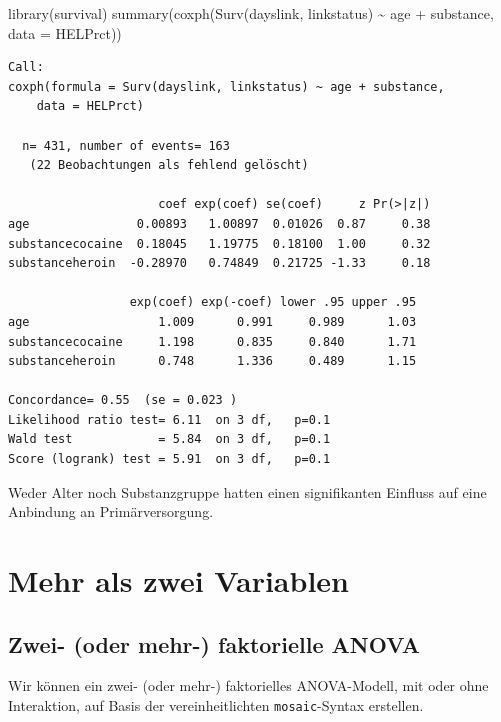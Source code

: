 \documentclass[
  ngerman,
]{scrbook}
\newenvironment{Shaded}{\begin{snugshade}}{\end{snugshade}}
\newcommand{\AttributeTok}[1]{\textcolor[rgb]{0.77,0.63,0.00}{#1}}
\newcommand{\FunctionTok}[1]{\textcolor[rgb]{0.00,0.00,0.00}{#1}}
\newcommand{\NormalTok}[1]{#1}
\newcommand{\SpecialCharTok}[1]{\textcolor[rgb]{0.00,0.00,0.00}{#1}}
\begin{document}
\begin{Shaded}
\begin{Highlighting}[]
\FunctionTok{library}\NormalTok{(survival)}
\FunctionTok{summary}\NormalTok{(}\FunctionTok{coxph}\NormalTok{(}\FunctionTok{Surv}\NormalTok{(dayslink, linkstatus) }\SpecialCharTok{\textasciitilde{}}\NormalTok{ age }\SpecialCharTok{+}\NormalTok{ substance, }
              \AttributeTok{data =}\NormalTok{ HELPrct))}
\end{Highlighting}
\end{Shaded}

\begin{verbatim}
Call:
coxph(formula = Surv(dayslink, linkstatus) ~ age + substance, 
    data = HELPrct)

  n= 431, number of events= 163 
   (22 Beobachtungen als fehlend gelöscht)

                     coef exp(coef) se(coef)     z Pr(>|z|)
age               0.00893   1.00897  0.01026  0.87     0.38
substancecocaine  0.18045   1.19775  0.18100  1.00     0.32
substanceheroin  -0.28970   0.74849  0.21725 -1.33     0.18

                 exp(coef) exp(-coef) lower .95 upper .95
age                  1.009      0.991     0.989      1.03
substancecocaine     1.198      0.835     0.840      1.71
substanceheroin      0.748      1.336     0.489      1.15

Concordance= 0.55  (se = 0.023 )
Likelihood ratio test= 6.11  on 3 df,   p=0.1
Wald test            = 5.84  on 3 df,   p=0.1
Score (logrank) test = 5.91  on 3 df,   p=0.1
\end{verbatim}

Weder Alter noch Substanzgruppe hatten einen signifikanten Einfluss auf eine Anbindung an Primärversorgung.

\hypertarget{mehrVars}{%
\chapter{Mehr als zwei Variablen}\label{mehrVars}}

\hypertarget{zwei--oder-mehr--faktorielle-anova}{%
\section{Zwei- (oder mehr-) faktorielle ANOVA}\label{zwei--oder-mehr--faktorielle-anova}}

Wir können ein zwei- (oder mehr-) faktorielles ANOVA-Modell, mit oder ohne Interaktion, auf Basis der vereinheitlichten \texttt{mosaic}-Syntax erstellen.
\end{document}
